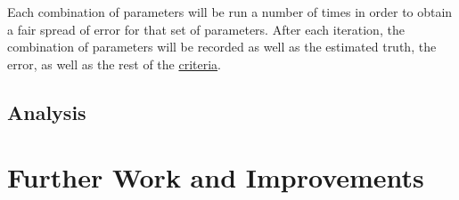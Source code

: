 Each combination of parameters will be run a number of times in order to obtain
a fair spread of error for that set of parameters.
After each iteration, the combination of parameters will be recorded as well
as the estimated truth, the error, as well as the rest of the
\hyperref[subsec:criteria]{criteria}.


\subsection{Analysis}\label{subsec:analysis}


\section{Further Work and Improvements}\label{sec:further-work-and-improvements}

